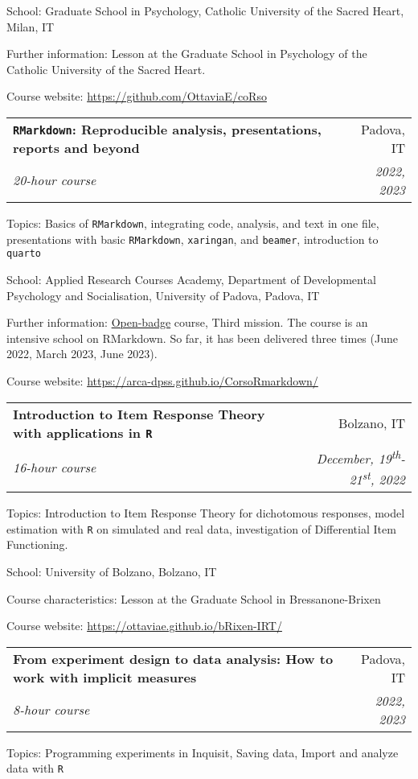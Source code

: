 \documentclass[letterpaper,12pt]{article}
\makeatletter
\newcommand{\resumeSubheading}[4]{
  \vspace{-1pt}\item
    \begin{tabular*}{0.97\textwidth}{l@{\extracolsep{\fill}}r}
      \textbf{#1} & #2 \\
      \textit{\small#3} & \textit{\small #4} \\
    \end{tabular*}\vspace{-5pt}
}
\makeatother
\begin{document}
{\small School: Graduate School in Psychology, Catholic University of the Sacred Heart, Milan,  IT} 

{\small Further information: Lesson at the Graduate School in Psychology of the Catholic University of the Sacred Heart. }

{\small Course website:  \href{https://github.com/OttaviaE/coRso}{https://github.com/OttaviaE/coRso}} 


\resumeSubheading {\texttt{RMarkdown}: Reproducible analysis, presentations, reports and beyond}{Padova, IT}{20-hour course}{\small{ 2022,  2023}}

{\small Topics: Basics of \texttt{RMarkdown}, integrating code, analysis, and text in one file, presentations with basic \texttt{RMarkdown}, \texttt{xaringan}, and \texttt{beamer}, introduction to \texttt{quarto}}

{\small School: Applied Research Courses Academy, Department of Developmental Psychology and Socialisation, University of Padova, Padova, IT} 

{\small Further information: \href{https://bestr.it/badge/show/3657}{Open-badge} course, Third mission. The course is an intensive school on RMarkdown. So far, it has been delivered three times (June 2022, March 2023, June 2023). } 

{\small Course website: \href{https://arca-dpss.github.io/CorsoRmarkdown/}{https://arca-dpss.github.io/CorsoRmarkdown/}}


\resumeSubheading {Introduction to Item Response Theory with applications in \texttt{R}}{Bolzano, IT}{16-hour course}{December, 19\textsuperscript{th}-21\textsuperscript{st}, 2022}

{\small Topics: Introduction to Item Response Theory for dichotomous responses, model estimation with \texttt{R} on simulated and real data, investigation of Differential Item Functioning. }

{\small School: University of Bolzano, Bolzano, IT} 

{\small Course characteristics: Lesson at the Graduate School in Bressanone-Brixen} 

{\small Course website:  \href{https://ottaviae.github.io/bRixen-IRT/}{https://ottaviae.github.io/bRixen-IRT/}} 

\resumeSubheading {From experiment design to data analysis: How to work with implicit measures}{Padova, IT}{8-hour course}{2022, 2023}

{\small Topics: Programming experiments in Inquisit, Saving data, Import and analyze data with \texttt{R}}
\end{document}
